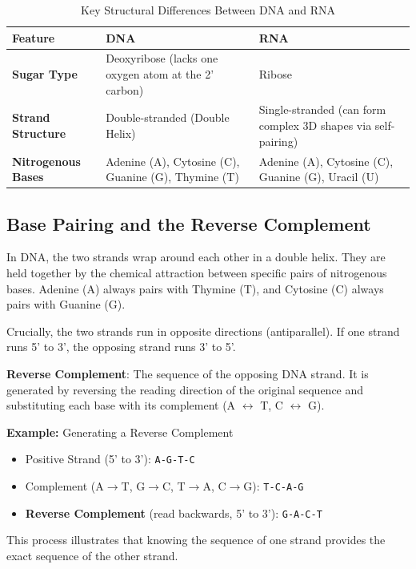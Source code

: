 \documentclass[11pt, a4paper]{article}
\begin{document}
\begin{table}[h!]
    \centering
    \caption{Key Structural Differences Between DNA and RNA}
    \begin{tabularx}{\textwidth}{l X X}
        \toprule
        \textbf{Feature} & \textbf{DNA} & \textbf{RNA} \\
        \midrule
        \textbf{Sugar Type} & Deoxyribose (lacks one oxygen atom at the 2' carbon) & Ribose \\
        \textbf{Strand Structure} & Double-stranded (Double Helix) & Single-stranded (can form complex 3D shapes via self-pairing) \\
        \textbf{Nitrogenous Bases} & Adenine (A), Cytosine (C), Guanine (G), Thymine (T) & Adenine (A), Cytosine (C), Guanine (G), Uracil (U) \\
        \bottomrule
    \end{tabularx}
\end{table}

\subsection{Base Pairing and the Reverse Complement}

In DNA, the two strands wrap around each other in a double helix. They are held together by the chemical attraction between specific pairs of nitrogenous bases. Adenine (A) always pairs with Thymine (T), and Cytosine (C) always pairs with Guanine (G). 

Crucially, the two strands run in opposite directions (antiparallel). If one strand runs 5' to 3', the opposing strand runs 3' to 5'. 

\begin{important}
    \textbf{Reverse Complement}: The sequence of the opposing DNA strand. It is generated by reversing the reading direction of the original sequence and substituting each base with its complement (A $\leftrightarrow$ T, C $\leftrightarrow$ G).
\end{important}

\textbf{Example:} Generating a Reverse Complement
\begin{itemize}
    \item Positive Strand (5' to 3'): \texttt{A-G-T-C}
    \item Complement (A$\to$T, G$\to$C, T$\to$A, C$\to$G): \texttt{T-C-A-G}
    \item \textbf{Reverse Complement} (read backwards, 5' to 3'): \texttt{G-A-C-T}
\end{itemize}
This process illustrates that knowing the sequence of one strand provides the exact sequence of the other strand.
\end{document}
